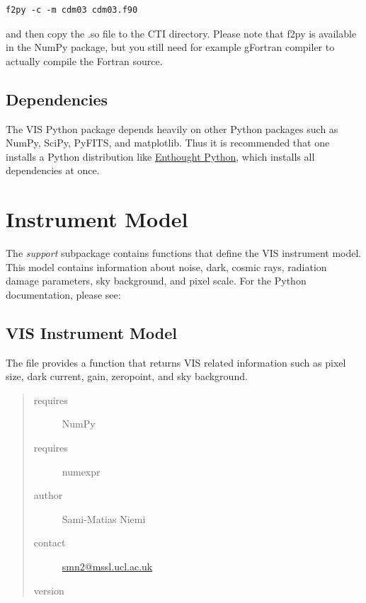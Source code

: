 \documentclass[a4paper,12pt,english]{sphinxmanual}
\begin{document}
\begin{Verbatim}[commandchars=\\\{\}]
f2py -c -m cdm03 cdm03.f90
\end{Verbatim}

and then copy the .so file to the CTI directory. Please note that f2py is available in the NumPy package,
but you still need for example gFortran compiler to actually compile the Fortran source.


\section{Dependencies}
\label{index:dependencies}
The VIS Python package depends heavily on other Python packages such as NumPy, SciPy, PyFITS, and matplotlib.
Thus it is recommended that one installs a Python distribution like \href{http://www.enthought.com/}{Enthought Python},
which installs all dependencies at once.


\chapter{Instrument Model}
\label{index:instrument-model}
The \emph{support} subpackage contains functions that define the VIS instrument model. This model contains information
about noise, dark, cosmic rays, radiation damage parameters, sky background, and pixel scale. For the Python
documentation, please see:
\label{instrument:module-support.VISinstrumentModel}

\section{VIS Instrument Model}
\label{instrument:vis-instrument-model}\label{instrument::doc}
The file provides a function that returns VIS related information such as pixel
size, dark current, gain, zeropoint, and sky background.
\begin{quote}\begin{description}
\item[{requires}] \leavevmode
NumPy

\item[{requires}] \leavevmode
numexpr

\item[{author}] \leavevmode
Sami-Matias Niemi

\item[{contact}] \leavevmode
\href{mailto:smn2@mssl.ucl.ac.uk}{smn2@mssl.ucl.ac.uk}

\item[{version}] 

\end{description}\end{quote}
\end{document}

